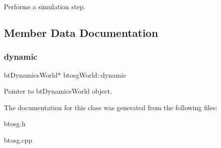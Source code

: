 Performs a simulation step. 

\subsection{Member Data Documentation}
\mbox{\label{classbtosgWorld_ad757a7b3b845142f200d1f2127e5372e}} 
\subsubsection{\texorpdfstring{dynamic}{dynamic}}
{\footnotesize\ttfamily bt\+Dynamics\+World$\ast$ btosg\+World\+::dynamic}

Pointer to bt\+Dynamics\+World object. 

The documentation for this class was generated from the following files\+:\begin{DoxyCompactItemize}
\item 
btosg.\+h\item 
btosg.\+cpp\end{DoxyCompactItemize}
